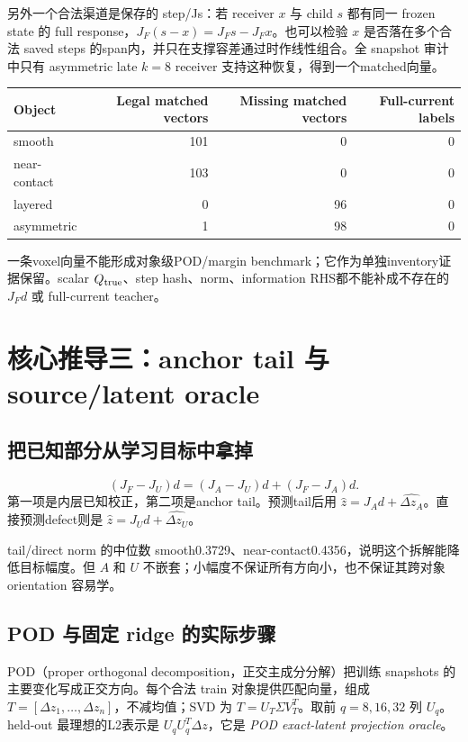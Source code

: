 \documentclass[UTF8,11pt,a4paper,fontset=fandol]{ctexart}
\begin{document}
另外一个合法渠道是保存的 step/Js：若 receiver $x$ 与 child $s$ 都有同一 frozen state 的 full response，$J_F(s-x)=J_Fs-J_Fx$。也可以检验 $x$ 是否落在多个合法 saved steps 的span内，并只在支撑容差通过时作线性组合。全 snapshot 审计中只有 asymmetric late $k=8$ receiver 支持这种恢复，得到一个matched向量。

\begin{center}\begin{tabular}{lrrr}\toprule
Object & Legal matched vectors & Missing matched vectors & Full-current labels\\\midrule
smooth &101&0&0\\near-contact &103&0&0\\layered &0&96&0\\asymmetric &1&98&0\\\bottomrule
\end{tabular}\end{center}
一条voxel向量不能形成对象级POD/margin benchmark；它作为单独inventory证据保留。scalar $Q_{\rm true}$、step hash、norm、information RHS都不能补成不存在的 $J_Fd$ 或 full-current teacher。

\section{核心推导三：anchor tail 与 source/latent oracle}
\subsection{把已知部分从学习目标中拿掉}
\[
 (J_F-J_U)d=(J_A-J_U)d+(J_F-J_A)d.
\]
第一项是内层已知校正，第二项是anchor tail。预测tail后用 $\hat z=J_Ad+\widehat{\Delta z_A}$。直接预测defect则是 $\hat z=J_Ud+\widehat{\Delta z_U}$。

tail/direct norm 的中位数 smooth0.3729、near-contact0.4356，说明这个拆解能降低目标幅度。但 $A$ 和 $U$ 不嵌套；小幅度不保证所有方向小，也不保证其跨对象 orientation 容易学。

\subsection{POD 与固定 ridge 的实际步骤}
POD（proper orthogonal decomposition，正交主成分分解）把训练 snapshots 的主要变化写成正交方向。每个合法 train 对象提供匹配向量，组成 $T=[\Delta z_1,\ldots,\Delta z_n]$，不减均值；SVD 为 $T=U_T\Sigma V_T^T$。取前 $q=8,16,32$ 列 $U_q$。held-out 最理想的L2表示是 $U_qU_q^T\Delta z$，它是 \emph{POD exact-latent projection oracle}。
\end{document}
